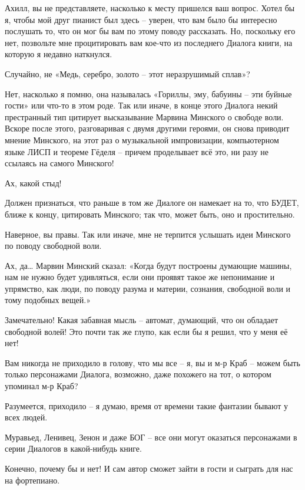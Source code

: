 \documentclass[../main.tex]{subfiles}
\begin{document}
\begin{dialogue}
 Ахилл, вы не представляете, насколько к месту пришелся ваш вопрос. Хотел бы я, чтобы мой друг пианист был здесь \--- уверен, что вам было бы интересно послушать то, что он мог бы вам по этому поводу рассказать. Но, поскольку его нет, позвольте мне процитировать вам кое-что из последнего Диалога книги, на которую я недавно наткнулся.

 Случайно, не «Медь, серебро, золото \--- этот неразрушимый сплав»?

 Нет, насколько я помню, она называлась «Гориллы, эму, бабуины \--- эти буйные гости» или что-то в этом роде. Так или иначе, в конце этого Диалога некий престранный тип цитирует высказывание Марвина Минского о свободе воли. Вскоре после этого, разговаривая с двумя другими героями, он снова приводит мнение Минского, на этот раз о музыкальной импровизации, компьютерном языке ЛИСП и теореме Гёделя \--- причем проделывает всё это, ни разу не ссылаясь на самого Минского!

 Ах, какой стыд!

 Должен признаться, что раньше в том же Диалоге он намекает на то, что БУДЕТ, ближе к концу, цитировать Минского; так что, может быть, оно и простительно.

 Наверное, вы правы. Так или иначе, мне не терпится услышать идеи Минского по поводу свободной воли.

 Ах, да\ldots{} Марвин Минский сказал: «Когда будут построены думающие машины, нам не нужно будет удивляться, если они проявят такое же непонимание и упрямство, как люди, по поводу разума и материи, сознания, свободной воли и тому подобных вещей.»

 Замечательно! Какая забавная мысль \--- автомат, думающий, что он обладает свободной волей! Это почти так же глупо, как если бы я решил, что у меня её нет!

 Вам никогда не приходило в голову, что мы все \--- я, вы и м-р Краб \--- можем быть только персонажами Диалога, возможно, даже похожего на тот, о котором упоминал м-р Краб?

 Разумеется, приходило \--- я думаю, время от времени такие фантазии бывают у всех людей.

 Муравьед, Ленивец, Зенон и даже БОГ \--- все они могут оказаться персонажами в серии Диалогов в какой-нибудь книге.

 Конечно, почему бы и нет! И сам автор сможет зайти в гости и сыграть для нас на фортепиано.


\end{dialogue}
\end{document}

